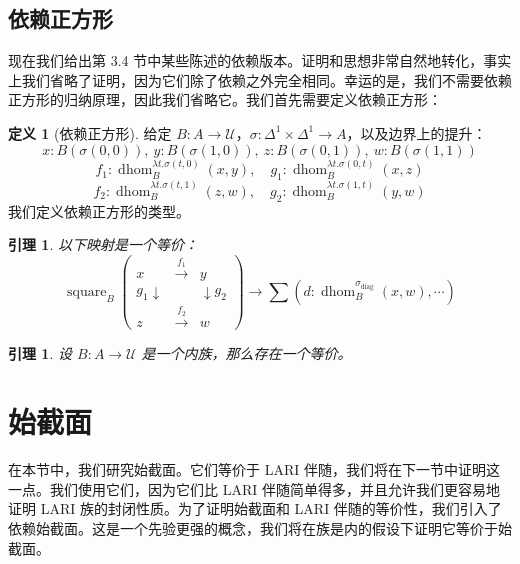 \documentclass{ctexrep}
\theoremstyle{plain}
\newtheorem{lemma}[theorem]{引理}
\theoremstyle{definition}
\newtheorem{definition}[theorem]{定义}
\theoremstyle{remark}
\theoremstyle{definition}
\theoremstyle{definition}
\theoremstyle{definition}
\newcommand{\UU}{\mathcal{U}}
\newcommand{\dhom}{\operatorname{dhom}}
\newcommand{\square}{\operatorname{square}}
\begin{document}
\section{依赖正方形}

现在我们给出第 3.4 节中某些陈述的依赖版本。证明和思想非常自然地转化，事实上我们省略了证明，因为它们除了依赖之外完全相同。幸运的是，我们不需要依赖正方形的归纳原理，因此我们省略它。我们首先需要定义依赖正方形：

\begin{definition}[依赖正方形]
给定 $B:A\to\UU$，$\sigma:\Delta^1\times\Delta^1\to A$，以及边界上的提升：
\[
x:B(\sigma(0,0)),\ y:B(\sigma(1,0)),\ z:B(\sigma(0,1)),\ w:B(\sigma(1,1))
\]
\[
f_1:\dhom_B^{\lambda t.\sigma(t,0)}(x,y),\quad g_1:\dhom_B^{\lambda t.\sigma(0,t)}(x,z)
\]
\[
f_2:\dhom_B^{\lambda t.\sigma(t,1)}(z,w),\quad g_2:\dhom_B^{\lambda t.\sigma(1,t)}(y,w)
\]
我们定义依赖正方形的类型。
\end{definition}

\begin{lemma}
以下映射是一个等价：
\[
\square_B\left( \begin{array}{ccc}
x & \xrightarrow{f_1} & y \\
g_1\downarrow & & \downarrow g_2 \\
z & \xrightarrow{f_2} & w
\end{array} \right) \to \sum \left( d:\dhom_B^{\sigma_{\text{diag}}}(x,w), \cdots \right)
\]
\end{lemma}

\begin{lemma}
设 $B:A\to\UU$ 是一个内族，那么存在一个等价。
\end{lemma}

\chapter{始截面}

在本节中，我们研究始截面。它们等价于 LARI 伴随，我们将在下一节中证明这一点。我们使用它们，因为它们比 LARI 伴随简单得多，并且允许我们更容易地证明 LARI 族的封闭性质。为了证明始截面和 LARI 伴随的等价性，我们引入了依赖始截面。这是一个先验更强的概念，我们将在族是内的假设下证明它等价于始截面。
\end{document}
